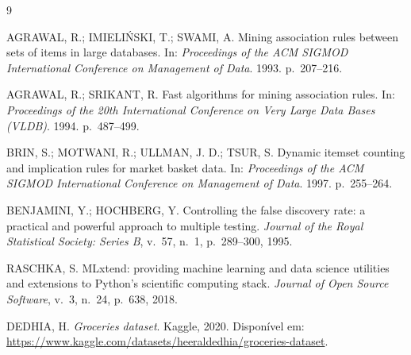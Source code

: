 \documentclass[11pt,a4paper]{article}
\begin{document}
\begin{thebibliography}{9}

AGRAWAL, R.; IMIELIŃSKI, T.; SWAMI, A. Mining association rules between sets of items in large databases. In: \emph{Proceedings of the ACM SIGMOD International Conference on Management of Data}. 1993. p.~207--216.

AGRAWAL, R.; SRIKANT, R. Fast algorithms for mining association rules. In: \emph{Proceedings of the 20th International Conference on Very Large Data Bases (VLDB)}. 1994. p.~487--499.

BRIN, S.; MOTWANI, R.; ULLMAN, J. D.; TSUR, S. Dynamic itemset counting and implication rules for market basket data. In: \emph{Proceedings of the ACM SIGMOD International Conference on Management of Data}. 1997. p.~255--264.

BENJAMINI, Y.; HOCHBERG, Y. Controlling the false discovery rate: a practical and powerful approach to multiple testing. \emph{Journal of the Royal Statistical Society: Series B}, v.~57, n.~1, p.~289--300, 1995.

RASCHKA, S. MLxtend: providing machine learning and data science utilities and extensions to Python's scientific computing stack. \emph{Journal of Open Source Software}, v.~3, n.~24, p.~638, 2018.

DEDHIA, H. \emph{Groceries dataset}. Kaggle, 2020. Disponível em: \url{https://www.kaggle.com/datasets/heeraldedhia/groceries-dataset}.

\end{thebibliography}
\end{document}
